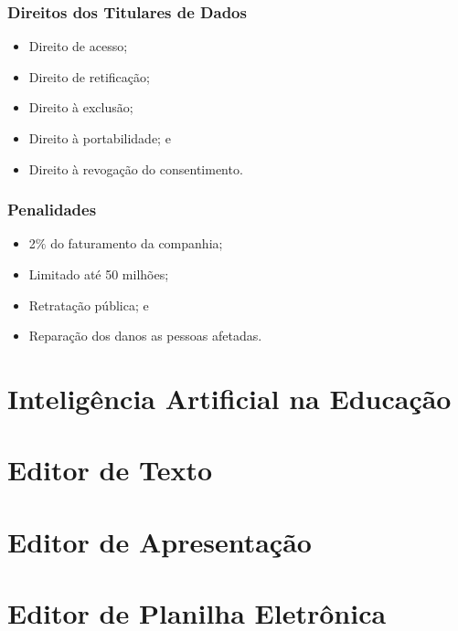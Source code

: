 \documentclass[aspectratio=169]{beamer} %
\begin{document}
\begin{frame}
	\frametitle{Direitos dos Titulares de Dados}
	
	\begin{itemize}
		\item Direito de acesso;
		\item Direito de retificação;
		\item Direito à exclusão;
		\item Direito à portabilidade; e
		\item Direito à revogação do consentimento.
	\end{itemize}
\end{frame}

\begin{frame}
	\frametitle{Penalidades}
	
	\begin{itemize}
		\item 2$\%$ do faturamento da companhia;
		\item Limitado até 50 milhões;
		\item Retratação pública; e
		\item Reparação dos danos as pessoas afetadas.
	\end{itemize}
\end{frame}


\section{Inteligência Artificial na Educação}

\section{Editor de Texto}

\section{Editor de Apresentação}

\section{Editor de Planilha Eletrônica}
\end{document}
